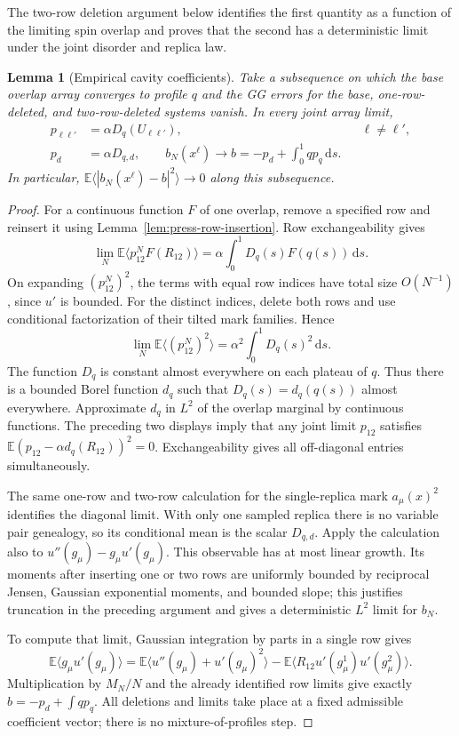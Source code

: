 \documentclass[11pt,a4paper]{article}
\numberwithin{equation}{section}
\newtheorem{lemma}[theorem]{Lemma}
\theoremstyle{definition}
\theoremstyle{remark}
\newcommand{\E}{\mathbb E}
\newcommand{\dd}{\mathrm d}
\begin{document}
The two-row deletion argument below identifies the first quantity as a
function of the limiting spin overlap and proves that the second has a
deterministic limit under the joint disorder and replica law.

\begin{lemma}[Empirical cavity coefficients]\label{lem:press-empirical}
Take a subsequence on which the base overlap array converges to profile $q$
and the GG errors for the base, one-row-deleted, and two-row-deleted systems
vanish. In every joint array limit,
\begin{equation}\label{eq:src8}
 \begin{aligned}
 p_{\ell\ell'}&=\alpha D_q(U_{\ell\ell'}),&&\ell\ne\ell',\\
 p_d&=\alpha D_{q,d},\qquad
 b_N(x^\ell)\longrightarrow b=-p_d+\int_0^1q p_q\,\dd s.
 \end{aligned}
\end{equation}
In particular,
$\E\langle|b_N(x^\ell)-b|^2\rangle\to0$ along this subsequence.
\end{lemma}

\begin{proof}
For a continuous function $F$ of one overlap, remove a specified row and
reinsert it using Lemma~\ref{lem:press-row-insertion}. Row exchangeability gives
\[
 \lim_N\E\langle p^N_{12}F(R_{12})\rangle
 =\alpha\int_0^1D_q(s)F(q(s))\,\dd s.
\]
On expanding $(p^N_{12})^2$, the terms with equal row indices have total size
$O(N^{-1})$, since $u'$ is bounded. For the distinct indices, delete both
rows and use conditional factorization of their tilted mark families. Hence
\[
 \lim_N\E\langle(p^N_{12})^2\rangle
 =\alpha^2\int_0^1D_q(s)^2\,\dd s.
\]
The function $D_q$ is constant almost everywhere on each plateau of $q$.
Thus there is a bounded Borel function $d_q$ such that
$D_q(s)=d_q(q(s))$ almost everywhere. Approximate $d_q$ in $L^2$ of the overlap
marginal by continuous functions. The preceding two displays imply that any
joint limit $p_{12}$ satisfies
$\E(p_{12}-\alpha d_q(R_{12}))^2=0$. Exchangeability gives all off-diagonal
entries simultaneously.

The same one-row and two-row calculation for the single-replica mark
$a_\mu(x)^2$ identifies the diagonal limit. With only one sampled replica
there is no variable pair genealogy, so its conditional mean is the scalar
$D_{q,d}$. Apply the calculation also to
$u''(g_\mu)-g_\mu u'(g_\mu)$. This observable has at most linear growth.
Its moments after inserting one or two rows are uniformly bounded by
reciprocal Jensen, Gaussian exponential moments, and bounded slope; this
justifies truncation in the preceding argument and gives a deterministic
$L^2$ limit for $b_N$.

To compute that limit, Gaussian integration by parts in a single row gives
\[
 \E\langle g_\mu u'(g_\mu)\rangle
 =\E\langle u''(g_\mu)+u'(g_\mu)^2\rangle
  -\E\langle R_{12}u'(g_\mu^1)u'(g_\mu^2)\rangle.
\]
Multiplication by $M_N/N$ and the already identified row limits give exactly
$b=-p_d+\int q p_q$. All deletions and limits take place at a fixed admissible
coefficient vector; there is no mixture-of-profiles step.
\end{proof}
\end{document}
